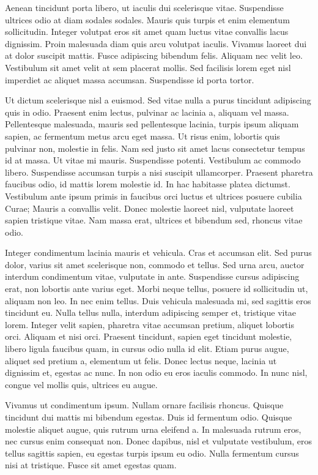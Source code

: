 Aenean tincidunt porta libero, ut iaculis dui scelerisque
vitae. Suspendisse ultrices odio at diam sodales sodales. Mauris quis
turpis et enim elementum sollicitudin. Integer volutpat eros sit amet
quam luctus vitae convallis lacus dignissim. Proin malesuada diam quis
arcu volutpat iaculis. Vivamus laoreet dui at dolor suscipit
mattis. Fusce adipiscing bibendum felis. Aliquam nec velit
leo. Vestibulum sit amet velit at sem placerat mollis. Sed facilisis
lorem eget nisl imperdiet ac aliquet massa accumsan. Suspendisse id
porta tortor.

Ut dictum scelerisque nisl a euismod. Sed vitae nulla a purus
tincidunt adipiscing quis in odio. Praesent enim lectus, pulvinar ac
lacinia a, aliquam vel massa. Pellentesque malesuada, mauris sed
pellentesque lacinia, turpis ipsum aliquam sapien, ac fermentum metus
arcu eget massa. Ut risus enim, lobortis quis pulvinar non, molestie
in felis. Nam sed justo sit amet lacus consectetur tempus id at
massa. Ut vitae mi mauris. Suspendisse potenti. Vestibulum ac commodo
libero. Suspendisse accumsan turpis a nisi suscipit
ullamcorper. Praesent pharetra faucibus odio, id mattis lorem molestie
id. In hac habitasse platea dictumst. Vestibulum ante ipsum primis in
faucibus orci luctus et ultrices posuere cubilia Curae; Mauris a
convallis velit. Donec molestie laoreet nisl, vulputate laoreet sapien
tristique vitae. Nam massa erat, ultrices et bibendum sed, rhoncus
vitae odio.

Integer condimentum lacinia mauris et vehicula. Cras et accumsan
elit. Sed purus dolor, varius sit amet scelerisque non, commodo et
tellus. Sed urna arcu, auctor interdum condimentum vitae, vulputate in
ante. Suspendisse cursus adipiscing erat, non lobortis ante varius
eget. Morbi neque tellus, posuere id sollicitudin ut, aliquam non
leo. In nec enim tellus. Duis vehicula malesuada mi, sed sagittis eros
tincidunt eu. Nulla tellus nulla, interdum adipiscing semper et,
tristique vitae lorem. Integer velit sapien, pharetra vitae accumsan
pretium, aliquet lobortis orci. Aliquam et nisi orci. Praesent
tincidunt, sapien eget tincidunt molestie, libero ligula faucibus
quam, in cursus odio nulla id elit. Etiam purus augue, aliquet sed
pretium a, elementum ut felis. Donec lectus neque, lacinia ut
dignissim et, egestas ac nunc. In non odio eu eros iaculis commodo. In
nunc nisl, congue vel mollis quis, ultrices eu augue.

Vivamus ut condimentum ipsum. Nullam ornare facilisis rhoncus. Quisque
tincidunt dui mattis mi bibendum egestas. Duis id fermentum
odio. Quisque molestie aliquet augue, quis rutrum urna eleifend a. In
malesuada rutrum eros, nec cursus enim consequat non. Donec dapibus,
nisl et vulputate vestibulum, eros tellus sagittis sapien, eu egestas
turpis ipsum eu odio. Nulla fermentum cursus nisi at tristique. Fusce
sit amet egestas quam.

